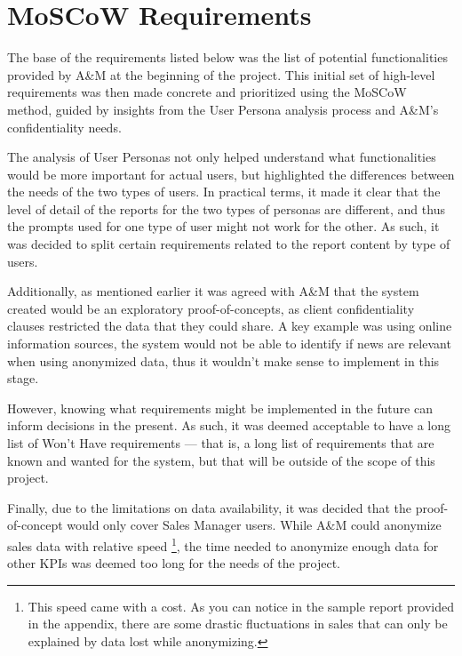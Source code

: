 \documentclass[a4paper]{report}
\begin{document}
\section{MoSCoW Requirements}


\newcommand{\frid}{FR-\arabic{frcounter}}
\newcommand{\nfrid}{NFR-\arabic{nfrcounter}}

The base of the requirements listed below was the list of potential functionalities provided by A\&M at the beginning of the project. This initial set of high-level requirements was then made concrete and prioritized using the MoSCoW method, guided by insights from the User Persona analysis process and A\&M's confidentiality needs.

The analysis of User Personas not only helped understand what functionalities would be more important for actual users, but highlighted the differences between the needs of the two types of users. In practical terms, it made it clear that the level of detail of the reports for the two types of personas are different, and thus the prompts used for one type of user might not work for the other. As such, it was decided to split certain requirements related to the report content by type of users.

Additionally, as mentioned earlier it was agreed with A\&M that the system created would be an exploratory proof-of-concepts, as client confidentiality clauses restricted the data that they could share. A key example was using online information sources, the system would not be able to identify if news are relevant when using anonymized data, thus it wouldn't make sense to implement in this stage.

However, knowing what requirements might be implemented in the future can inform decisions in the present. As such, it was deemed acceptable to have a long list of Won't Have requirements --- that is, a long list of requirements that are known and wanted for the system, but that will be outside of the scope of this project.

Finally, due to the limitations on data availability, it was decided that the proof-of-concept would only cover Sales Manager users. While A\&M could anonymize sales data with relative speed \footnote{This speed came with a cost. As you can notice in the sample report provided in the appendix, there are some drastic fluctuations in sales that can only be explained by data lost while anonymizing.}, the time needed to anonymize enough data for other KPIs was deemed too long for the needs of the project.
\end{document}
